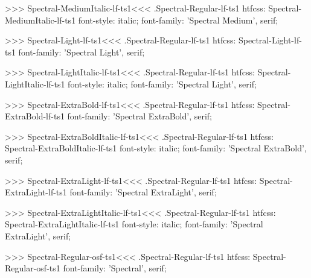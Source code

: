 >>>
\<Spectral-MediumItalic-lf-ts1\><<<
.Spectral-Regular-lf-ts1
htfcss:  Spectral-MediumItalic-lf-ts1  font-style: italic; font-family: 'Spectral Medium', serif;

>>>
\<Spectral-Light-lf-ts1\><<<
.Spectral-Regular-lf-ts1
htfcss:  Spectral-Light-lf-ts1  font-family: 'Spectral Light', serif;

>>>
\<Spectral-LightItalic-lf-ts1\><<<
.Spectral-Regular-lf-ts1
htfcss:  Spectral-LightItalic-lf-ts1  font-style: italic; font-family: 'Spectral Light', serif;

>>>
\<Spectral-ExtraBold-lf-ts1\><<<
.Spectral-Regular-lf-ts1
htfcss:  Spectral-ExtraBold-lf-ts1  font-family: 'Spectral ExtraBold', serif;

>>>
\<Spectral-ExtraBoldItalic-lf-ts1\><<<
.Spectral-Regular-lf-ts1
htfcss:  Spectral-ExtraBoldItalic-lf-ts1  font-style: italic; font-family: 'Spectral ExtraBold', serif;

>>>
\<Spectral-ExtraLight-lf-ts1\><<<
.Spectral-Regular-lf-ts1
htfcss:  Spectral-ExtraLight-lf-ts1  font-family: 'Spectral ExtraLight', serif;

>>>
\<Spectral-ExtraLightItalic-lf-ts1\><<<
.Spectral-Regular-lf-ts1
htfcss:  Spectral-ExtraLightItalic-lf-ts1  font-style: italic; font-family: 'Spectral ExtraLight', serif;

>>>
\<Spectral-Regular-osf-ts1\><<<
.Spectral-Regular-lf-ts1
htfcss:  Spectral-Regular-osf-ts1  font-family: 'Spectral', serif;


